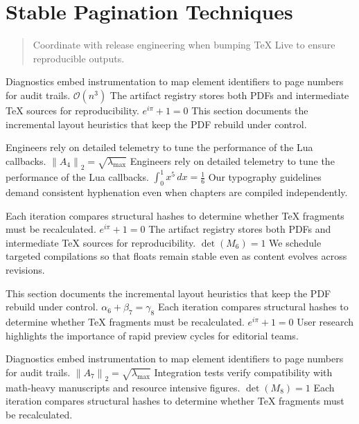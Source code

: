     \section{Stable Pagination Techniques}
    
    \begin{quote}
      Coordinate with release engineering when bumping TeX Live to ensure reproducible outputs.
    \end{quote}
  
    Diagnostics embed instrumentation to map element identifiers to page numbers for audit trails.  $\mathcal{O}(n^{3})$  The artifact registry stores both PDFs and intermediate TeX sources for reproducibility.  $e^{i\pi} + 1 = 0$  This section documents the incremental layout heuristics that keep the PDF rebuild under control.
    \par
  
    Engineers rely on detailed telemetry to tune the performance of the Lua callbacks.  $\left\|A_{4}\right\|_{2} = \sqrt{\lambda_{\max}}$  Engineers rely on detailed telemetry to tune the performance of the Lua callbacks.  $\int_{0}^{1} x^{5} \, dx = \frac{1}{6}$  Our typography guidelines demand consistent hyphenation even when chapters are compiled independently.
    \par
  
    Each iteration compares structural hashes to determine whether TeX fragments must be recalculated.  $e^{i\pi} + 1 = 0$  The artifact registry stores both PDFs and intermediate TeX sources for reproducibility.  $\det(M_{6}) = 1$  We schedule targeted compilations so that floats remain stable even as content evolves across revisions.
    \par
  
    This section documents the incremental layout heuristics that keep the PDF rebuild under control.  $\alpha_{6} + \beta_{7} = \gamma_{8}$  Each iteration compares structural hashes to determine whether TeX fragments must be recalculated.  $e^{i\pi} + 1 = 0$  User research highlights the importance of rapid preview cycles for editorial teams.
    \par
  
    Diagnostics embed instrumentation to map element identifiers to page numbers for audit trails.  $\left\|A_{7}\right\|_{2} = \sqrt{\lambda_{\max}}$  Integration tests verify compatibility with math-heavy manuscripts and resource intensive figures.  $\det(M_{8}) = 1$  Each iteration compares structural hashes to determine whether TeX fragments must be recalculated.
    \par
  

